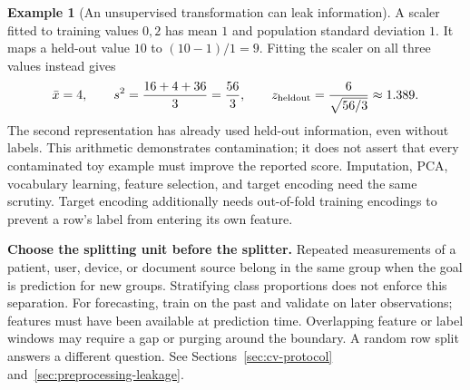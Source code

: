 \documentclass[11pt,twoside]{article}
\numberwithin{equation}{section}
\theoremstyle{plain}
\theoremstyle{definition}
\newtheorem{example}[theorem]{Example}
\theoremstyle{remark}
\newenvironment{keyidea}{
  \begin{tcolorbox}[colback=yellow!5!white,
                    colframe=yellow!50!black,
                    title=Key Idea,
                    breakable,
                    enhanced,
                    sharp corners,
                    boxrule=0.8pt,
                    left=6pt, right=6pt, top=6pt, bottom=6pt]
}{
  \end{tcolorbox}
}
\begin{document}
\begin{example}[An unsupervised transformation can leak information]
A scaler fitted to training values $0,2$ has mean $1$ and population standard deviation $1$. It maps a held-out value $10$ to $(10-1)/1=9$. Fitting the scaler on all three values instead gives
\[
\bar x=4,\qquad s^2=\frac{16+4+36}{3}=\frac{56}{3},\qquad
z_{\rm heldout}=\frac{6}{\sqrt{56/3}}\approx1.389.
\]
The second representation has already used held-out information, even without labels. This arithmetic demonstrates contamination; it does not assert that every contaminated toy example must improve the reported score. Imputation, PCA, vocabulary learning, feature selection, and target encoding need the same scrutiny. Target encoding additionally needs out-of-fold training encodings to prevent a row's label from entering its own feature.
\end{example}

\begin{keyidea}
\textbf{Choose the splitting unit before the splitter.} Repeated measurements of a patient, user, device, or document source belong in the same group when the goal is prediction for new groups. Stratifying class proportions does not enforce this separation. For forecasting, train on the past and validate on later observations; features must have been available at prediction time. Overlapping feature or label windows may require a gap or purging around the boundary. A random row split answers a different question. See Sections~\ref{sec:cv-protocol} and~\ref{sec:preprocessing-leakage}.
\end{keyidea}
\end{document}
